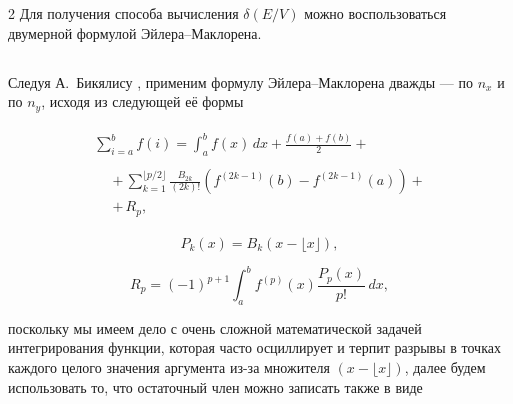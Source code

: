 \documentclass[twoside, 10pt]{article}
\def\myvspacebeforesubsection{-2.0mm}
\def\myvspaceaftersubsection{-2.5mm}
\begin{document}
\begin{multicols}{2}
    Для получения способа вычисления \(\delta\left(E/V\right)\) можно воспользоваться двумерной формулой Эйлера–Маклорена.


\vspace{\myvspacebeforesubsection}
\subsection*{} \label{eulermaclaurin-2d-formula}
\vspace{\myvspaceaftersubsection}


Следуя А.~Бикялису \cite{Bikyalis1968}, применим формулу Эйлера–Маклорена дважды — по \(n_x\) и по \(n_y\), исходя из следующей её формы


    \begin{equation} \label{eq:7}
\begin{array}{l}
\begin{array}{ll}
\displaystyle \sum _{i=a}^{b}f(i)= \int_{a}^{b}f(x)\,dx+{\frac {f(a)+f(b)}{2}} + & \,\,\,\,
\end{array}  \\
\begin{array}{rr}
\,\,\, & +\,\sum_{k=1}^{\lfloor p/2\rfloor }{\frac {B_{2k}}{(2k)!}}\left(f^{(2k-1)}(b)-f^{(2k-1)}(a)\right)+ \\
\,\,\, & + \,R_{p},
\end{array}
\end{array}\end{equation}

\begin{equation} \label{eq:8}
{\displaystyle P_{k}(x)=B_{k}\left(x-\lfloor x\rfloor \right),}
\end{equation}

\begin{equation} \label{eq:9}
{\displaystyle R_{p}=(-1)^{p+1}\int_{a}^{b}f^{(p)}(x){\frac {P_{p}(x)}{p!}}\,dx},
\end{equation}

поскольку мы имеем дело с очень сложной математической задачей интегрирования функции, которая часто осциллирует и терпит разрывы в точках каждого целого значения аргумента из-за множителя \((x-\lfloor x\rfloor )\), далее будем использовать то, что остаточный член можно записать также в виде


\end{multicols}
\end{document}
